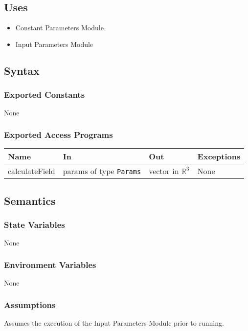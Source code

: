 \documentclass[12pt, titlepage]{article}
\begin{document}
\subsection{Uses}
\begin{itemize}
  \item Constant Parameters Module
  \item Input Parameters Module
\end{itemize}

\subsection{Syntax}

\subsubsection{Exported Constants}
None

\subsubsection{Exported Access Programs}
\begin{center}
\begin{tabular}{p{3cm} p{4cm} p{4cm} p{3cm}}
\hline
\textbf{Name} & \textbf{In} & \textbf{Out} & \textbf{Exceptions} \\
\hline
calculateField & params of type \texttt{Params} & vector in $\mathbb{R}^3$ & None \\
\hline
\end{tabular}
\end{center}

\subsection{Semantics}

\subsubsection{State Variables}
None

\subsubsection{Environment Variables}
None

\subsubsection{Assumptions}
Assumes the execution of the Input Parameters Module prior to running. 
\end{document}
